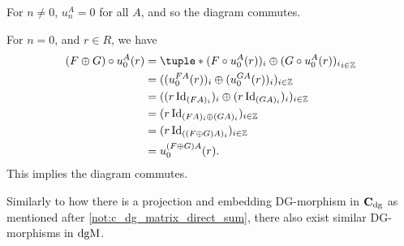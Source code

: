 \begin{remark}
\begin{itemize}
{            For \( n \neq 0 \), \( u_n^A = 0 \) for all \( A \), and so the diagram commutes.

            For \( n = 0 \), and \( r \in R \), we have
            \begin{align*}
                (F \oplus G) \circ u_0^A (r) &= \tuple*{ (F \circ u_0^A (r))_i \oplus (G \circ u_0^A (r))_i }_{i \in \Zb} \\
                &= ((u_0^{F A} (r))_i \oplus (u_0^{G A} (r))_i)_{i \in \Zb} \\
                &= ((r \Id_{(F A)_i})_i \oplus (r \Id_{(G A)_i})_i)_{i \in \Zb} \\
                &= (r \Id_{(F A)_i \oplus (G A)_i})_{i \in \Zb} \\
                &= (r \Id_{((F \oplus G ) A)_i })_{i \in \Zb} \\
                &= u_0^{(F \oplus G ) A} (r).
            \end{align*}
            This implies the diagram commutes.
        }
    \end{itemize}
\end{remark}

Similarly to how there is a projection and embedding DG-morphism in \( \operatorname{\mathbf{C}}_{\operatorname{dg}} \) as mentioned after \autoref{not:c_dg_matrix_direct_sum}, there also exist similar DG-morphisms in \( \operatorname{dgM} \).

